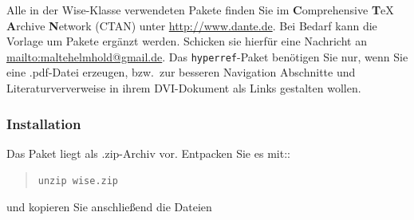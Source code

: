 \documentclass[english, trackchanges, hyperref, ngerman ,pdf, mp, mppdf]{wise}
\newcommand\code[1]{\texttt{#1}}
\begin{document}
Alle in der Wise-Klasse verwendeten Pakete finden Sie im \textbf{C}omprehensive
\textbf{T}eX \textbf{A}rchive \textbf{N}etwork (CTAN) unter \url{http://www.dante.de}. Bei Bedarf kann die Vorlage um Pakete ergänzt werden. Schicken sie hierfür eine Nachricht an \url{mailto:maltehelmhold@gmail.de}. 
Das \code{hyperref}-Paket
benötigen Sie nur, wenn Sie eine .pdf-Datei erzeugen, bzw.\ zur besseren
Navigation Abschnitte und Literaturververweise in ihrem DVI-Dokument
als Links gestalten wollen. 

\subsubsection{Installation}

Das Paket liegt als .zip-Archiv vor. Entpacken Sie es mit::

\begin{quotation}
\code{unzip wise.zip}
\end{quotation}
und kopieren Sie anschließend die Dateien
\end{document}
